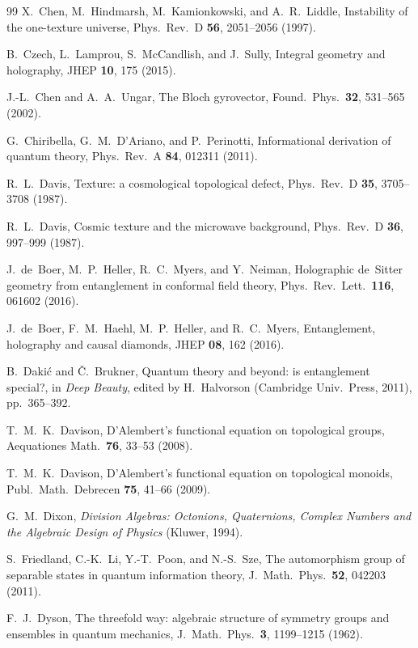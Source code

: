 \documentclass[aps,pra,onecolumn,superscriptaddress,nofootinbib,10pt]{revtex4-2}
\theoremstyle{definition}
\theoremstyle{remark}
\begin{document}
\begin{thebibliography}{99}
 X.~Chen, M.~Hindmarsh, M.~Kamionkowski, and A.~R.~Liddle, Instability of the one-texture universe, Phys.\ Rev.\ D \textbf{56}, 2051--2056 (1997).

 B.~Czech, L.~Lamprou, S.~McCandlish, and J.~Sully, Integral geometry and holography, JHEP \textbf{10}, 175 (2015).

 J.-L.~Chen and A.~A.~Ungar, The Bloch gyrovector, Found.\ Phys.\ \textbf{32}, 531--565 (2002).

 G.~Chiribella, G.~M.~D'Ariano, and P.~Perinotti, Informational derivation of quantum theory, Phys.\ Rev.\ A \textbf{84}, 012311 (2011).

 R.~L.~Davis, Texture: a cosmological topological defect, Phys.\ Rev.\ D \textbf{35}, 3705--3708 (1987).

 R.~L.~Davis, Cosmic texture and the microwave background, Phys.\ Rev.\ D \textbf{36}, 997--999 (1987).

 J.~de~Boer, M.~P.~Heller, R.~C.~Myers, and Y.~Neiman, Holographic de~Sitter geometry from entanglement in conformal field theory, Phys.\ Rev.\ Lett.\ \textbf{116}, 061602 (2016).

 J.~de~Boer, F.~M.~Haehl, M.~P.~Heller, and R.~C.~Myers, Entanglement, holography and causal diamonds, JHEP \textbf{08}, 162 (2016).

 B.~Daki\'c and \v{C}.~Brukner, Quantum theory and beyond: is entanglement special?, in \emph{Deep Beauty}, edited by H.~Halvorson (Cambridge Univ.\ Press, 2011), pp.~365--392.

 T.~M.~K.~Davison, D'Alembert's functional equation on topological groups, Aequationes Math.\ \textbf{76}, 33--53 (2008).

 T.~M.~K.~Davison, D'Alembert's functional equation on topological monoids, Publ.\ Math.\ Debrecen \textbf{75}, 41--66 (2009).

 G.~M.~Dixon, \emph{Division Algebras: Octonions, Quaternions, Complex Numbers and the Algebraic Design of Physics} (Kluwer, 1994).

 S.~Friedland, C.-K.~Li, Y.-T.~Poon, and N.-S.~Sze, The automorphism group of separable states in quantum information theory, J.\ Math.\ Phys.\ \textbf{52}, 042203 (2011).

 F.~J.~Dyson, The threefold way: algebraic structure of symmetry groups and ensembles in quantum mechanics, J.\ Math.\ Phys.\ \textbf{3}, 1199--1215 (1962).


\end{thebibliography}
\end{document}
